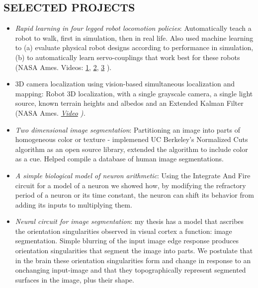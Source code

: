 \documentclass[conference,lettersize,twocolumn,twosize]{./IEEEtran}
\begin{document}
\subsection*{SELECTED PROJECTS}
\begin{center}
  \begin{itemize}
  \item{\emph{Rapid learning in four legged robot locomotion
      policies}: Automatically teach a robot to walk, first in
    simulation, then in real life. Also used machine learning to (a)
    evaluate physical robot designs according to performance in
    simulation, (b) to automatically learn servo-couplings that work
    best for these robots (NASA Ames. Videos:
    \href{https://www.youtube.com/watch?v=nOca5QXBuTQ}{1},
    \href{https://www.youtube.com/watch?v=\_Dw67QpAlhU}{2}, 
    \href{https://www.youtube.com/watch?v=rp31BvijiqU}{3}
    ).}
  \item{3D camera localization using vision-based simultaneous
    localization and mapping}: Robot 3D localization, with a single
    grayscale camera, a single light source, known terrain heights and
    albedos and an Extended Kalman Filter (NASA Ames.
    \emph{\href{https://www.youtube.com/watch?v=zmq\_9Zw\_Awo)}{Video}
      ).}
  \item{\emph{Two dimensional image segmentation}: Partitioning an
    image into parts of homogeneous color or texture - implemened UC
    Berkeley's Normalized Cuts algorithm as an open source library,
    extended the algorithm to include color as a cue. Helped compile a
    database of human image segmentations.}
  \item{\emph{A simple biological model of neuron arithmetic}: Using
    the Integrate And Fire circuit for a model of a neuron we showed
    how, by modifying the refractory period of a neuron or its time
    constant, the neuron can shift its behavior from adding its inputs
    to multiplying them.}
  \item{\emph{Neural circuit for image segmentation}:
    my thesis has a model that ascribes the orientation singularities
    observed in visual cortex a function: image segmentation. Simple
    blurring of the input image edge response produces orientation
    singularities that segment the image into parts. We postulate that
    in the brain these orientation singularities form and change in
    response to an onchanging input-image and that they
    topographically represent segmented surfaces in the image, plus
    their shape.}
  \end{itemize}
\end{center}
\end{document}
